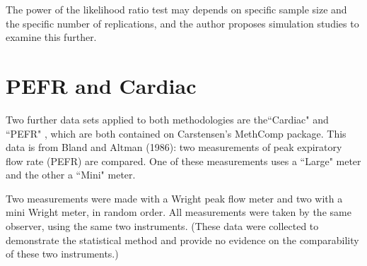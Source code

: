 \documentclass[12pt, a4paper]{report}
\theoremstyle{plain}
\theoremstyle{definition}
\theoremstyle{remark}
\begin{document}
The power of the
likelihood ratio test may depends on specific sample size and the
specific number of  replications, and the author proposes
simulation studies to examine this further.

	\section{PEFR and Cardiac}
	
	
	Two further data sets applied to both methodologies are the``Cardiac" and ``PEFR" , which are both contained on Carstensen's MethComp package. This data is from Bland and Altman (1986): two measurements of peak expiratory flow rate (PEFR) are compared. One of these measurements uses a ``Large" meter and the other a ``Mini" meter.
	
	Two measurements were made with a Wright peak flow meter and two with a mini Wright meter, in random order.  All measurements were taken by the same observer, using the same two instruments. (These data were collected to demonstrate the statistical method and provide no evidence on the comparability of these two instruments.)
	

	


\end{document}
